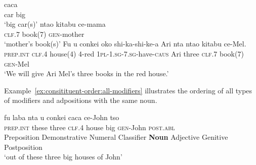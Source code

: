 \begin{exe}
\ex
{} caca \\
car big \\
\trans `big car(s)'
\ex
\gll nta\textbeltl o kitabu ce-mama \\
\textsc{clf.7} book(7) \textsc{gen}-mother \\
\trans `mother's book(s)'
\ex
\gll Fu u conkei \textbeltl oko shi-ka-shi-ke-\textbeltl a Ari nta nta\textbeltl o kitabu ce-Mel. \\
\textsc{prep.int} \textsc{clf.4} house(4) 4-red \textsc{1pl}-\textsc{1.sg}-\textsc{7.sg}-have-\textsc{caus} Ari three \textsc{clf}.7 book(7) \textsc{gen}-Mel \\
\trans `We will give Ari Mel's three books in the red house.'
\end{exe}

Example~\ref{ex:consitituent-order:all-modifiers} illustrates the ordering of all types of modifiers and adpositions with the same noun.

\begin{exe}
\ex
\glll fu laba nta u conkei caca ce-John tso \\
\textsc{prep.int} these three \textsc{clf.4} house big \textsc{gen}-John \textsc{post.abl} \\
Preposition Demonstrative Numeral Classifier \textbf{Noun} Adjective Genitive Postposition \\
\trans `out of these three big houses of John'
\label{ex:consitituent-order:all-modifiers}
\end{exe}